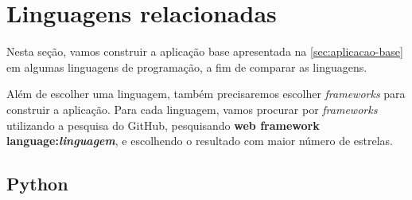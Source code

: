 \begin{table}[htb]
  \caption[\textit{Endpoints} da aplicação base]{\textit{Endpoints} da aplicação base}
  \label{tab-base-endpoints}
\end{table}

\section{Linguagens relacionadas}

Nesta seção, vamos construir a aplicação base apresentada na \autoref{sec:aplicacao-base}
em algumas linguagens de programação, a fim de comparar as linguagens.

Além de escolher uma linguagem, também precisaremos escolher \textit{frameworks}
para construir a aplicação. Para cada linguagem, vamos procurar por \textit{frameworks}
utilizando a pesquisa do GitHub, pesquisando \textbf{web framework language:\textit{linguagem}},
e escolhendo o resultado com maior número de estrelas.

\subsection{Python}\label{subsec:python}

